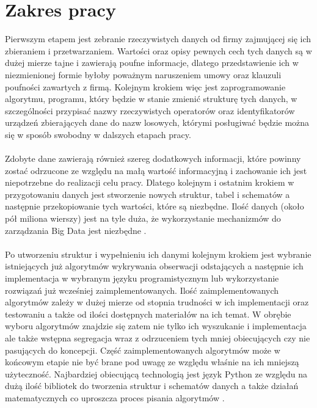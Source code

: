 \documentclass[eng,printmode]{mgr}
\begin{document}
\section{Zakres pracy}
Pierwszym etapem jest zebranie rzeczywistych danych od firmy zajmującej się ich zbieraniem i przetwarzaniem. Wartości oraz opisy pewnych cech tych danych są w dużej mierze tajne i zawierają poufne informacje, dlatego przedstawienie ich w niezmienionej formie byłoby poważnym naruszeniem umowy oraz klauzuli poufności zawartych z firmą. Kolejnym krokiem więc jest zaprogramowanie algorytmu, programu, który będzie w stanie zmienić strukturę tych danych, w szczególności przypisać nazwy rzeczywistych operatorów oraz identyfikatorów urządzeń zbierających dane do nazw losowych, którymi posługiwać będzie można się w sposób swobodny w dalszych etapach pracy. 
\\\\
Zdobyte dane zawierają również szereg dodatkowych informacji, które powinny zostać odrzucone ze względu na małą wartość informacyjną i zachowanie ich jest niepotrzebne do realizacji celu pracy. Dlatego kolejnym i ostatnim krokiem w przygotowaniu danych jest stworzenie nowych struktur, tabel i schematów a następnie przekopiowanie tych wartości, które są niezbędne. Ilość danych (około pół miliona wierszy) jest na tyle duża, że wykorzystanie mechanizmów do zarządzania Big Data jest niezbędne \cite{cassandra}\cite {cassandra-driver}.
\\\\
Po utworzeniu struktur i wypełnieniu ich danymi kolejnym krokiem jest wybranie istniejących już algorytmów wykrywania obserwacji odstających \cite{outliers-basic} a następnie ich implementacja w wybranym języku programistycznym lub wykorzystanie rozwiązań już wcześniej zaimplementowanych. Ilość zaimplementowanych algorytmów zależy w dużej mierze od stopnia trudności w ich implementacji oraz testowaniu a także od ilości dostępnych materiałów na ich temat. W obrębie wyboru algorytmów znajdzie się zatem nie tylko ich wyszukanie i implementacja ale także wstępna segregacja wraz z odrzuceniem tych mniej obiecujących czy nie pasujących do koncepcji. Część zaimplementowanych algorytmów może w końcowym etapie nie być brane pod uwagę ze względu właśnie na ich mniejszą użyteczność. Najbardziej obiecującą technologią jest język Python \cite{python} ze względu na dużą ilość bibliotek do tworzenia struktur i schematów danych \cite{pandas} a także działań matematycznych co uproszcza proces pisania algorytmów \cite{numpy}.
\\\\
\end{document}
